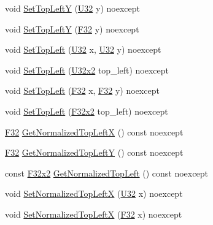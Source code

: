 \begin{DoxyCompactItemize}
\item 
void \hyperlink{classmage_1_1_viewport_afb82849d9082a60372add783d89263e4}{Set\+Top\+LeftY} (\hyperlink{namespacemage_a41c104c036fba3756a74e19f793eeaa1}{U32} y) noexcept
\item 
void \hyperlink{classmage_1_1_viewport_a4cd53109a4198cdcfbb46f260148311f}{Set\+Top\+LeftY} (\hyperlink{namespacemage_aa97e833b45f06d60a0a9c4fc22ae02c0}{F32} y) noexcept
\item 
void \hyperlink{classmage_1_1_viewport_a14f63922d0bd2613b3fc2b86683f13a7}{Set\+Top\+Left} (\hyperlink{namespacemage_a41c104c036fba3756a74e19f793eeaa1}{U32} x, \hyperlink{namespacemage_a41c104c036fba3756a74e19f793eeaa1}{U32} y) noexcept
\item 
void \hyperlink{classmage_1_1_viewport_a46585a2e52c3d8f3f51d0dd25a85109d}{Set\+Top\+Left} (\hyperlink{namespacemage_a88e05bff0300120c013285d3dcad95c5}{U32x2} top\+\_\+left) noexcept
\item 
void \hyperlink{classmage_1_1_viewport_a982a30c583445f04516cfae876667e62}{Set\+Top\+Left} (\hyperlink{namespacemage_aa97e833b45f06d60a0a9c4fc22ae02c0}{F32} x, \hyperlink{namespacemage_aa97e833b45f06d60a0a9c4fc22ae02c0}{F32} y) noexcept
\item 
void \hyperlink{classmage_1_1_viewport_a1a8288b66a42e6519d71c57d06af099a}{Set\+Top\+Left} (\hyperlink{namespacemage_aa87237ad091f5cd7da612b8523fc108f}{F32x2} top\+\_\+left) noexcept
\item 
\hyperlink{namespacemage_aa97e833b45f06d60a0a9c4fc22ae02c0}{F32} \hyperlink{classmage_1_1_viewport_a513fd8bd0a859e291195aaea2ed71471}{Get\+Normalized\+Top\+LeftX} () const noexcept
\item 
\hyperlink{namespacemage_aa97e833b45f06d60a0a9c4fc22ae02c0}{F32} \hyperlink{classmage_1_1_viewport_adcf6289a0778f2ed3a75de0b57bf39ec}{Get\+Normalized\+Top\+LeftY} () const noexcept
\item 
const \hyperlink{namespacemage_aa87237ad091f5cd7da612b8523fc108f}{F32x2} \hyperlink{classmage_1_1_viewport_a97b184ee368f96cc5343679735972adf}{Get\+Normalized\+Top\+Left} () const noexcept
\item 
void \hyperlink{classmage_1_1_viewport_a55f7e01e6f7c184665548fe5259b6bdd}{Set\+Normalized\+Top\+LeftX} (\hyperlink{namespacemage_a41c104c036fba3756a74e19f793eeaa1}{U32} x) noexcept
\item 
void \hyperlink{classmage_1_1_viewport_a48d6fbbc9023ae69f7c77cd2c199d37d}{Set\+Normalized\+Top\+LeftX} (\hyperlink{namespacemage_aa97e833b45f06d60a0a9c4fc22ae02c0}{F32} x) noexcept

\end{DoxyCompactItemize}

